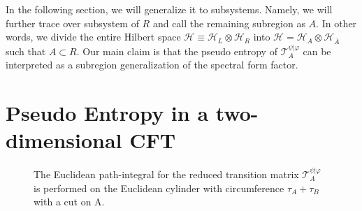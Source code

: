 \documentclass[%
twocolumn, 
secnumarabic,amssymb, preprintnumbers, superscriptaddress, aps, prl]{revtex4-1}
\begin{document}
In the following section, we will generalize it to subsystems. Namely, we will further trace over subsystem of $R$ and call the remaining subregion as $A$. In other words, we divide the entire Hilbert space $\mathcal{H}\equiv\mathcal{H}_L\otimes\mathcal{H}_R$ into $\mathcal{H}=\mathcal{H}_A\otimes\mathcal{H}_{\bar{A}}$ such that $A\subset R$. Our main claim is that the pseudo entropy of $\mathcal{T}^{\psi|\varphi}_A$ can be interpreted as a subregion generalization of the spectral form factor.
\section{Pseudo Entropy in a two-dimensional CFT}
\begin{figure}[t]
 \begin{center}
 \end{center}
 \caption{The Euclidean path-integral for the reduced transition matrix $\mathcal{T}^{\psi|\varphi}_A$ is performed on the Euclidean cylinder with circumference $\tau_A+\tau_B$ with a cut on A.}
 \label{fig:EPI}
\end{figure}
\end{document}
